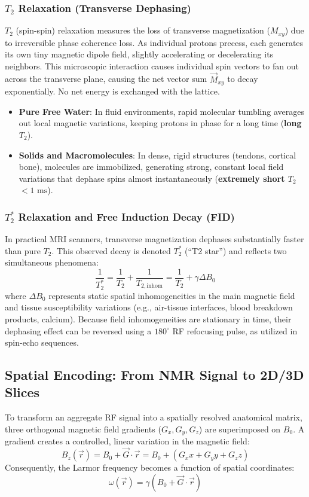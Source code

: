 \documentclass[11pt,a4paper]{article}
\begin{document}
\subsubsection{$T_2$ Relaxation (Transverse Dephasing)}
$T_2$ (spin-spin) relaxation measures the loss of transverse magnetization ($M_{xy}$) due to irreversible phase coherence loss. As individual protons precess, each generates its own tiny magnetic dipole field, slightly accelerating or decelerating its neighbors. This microscopic interaction causes individual spin vectors to fan out across the transverse plane, causing the net vector sum $\vec{M}_{xy}$ to decay exponentially. No net energy is exchanged with the lattice.
\begin{itemize}
    \item \textbf{Pure Free Water}: In fluid environments, rapid molecular tumbling averages out local magnetic variations, keeping protons in phase for a long time (\textbf{long $T_2$}).
    \item \textbf{Solids and Macromolecules}: In dense, rigid structures (tendons, cortical bone), molecules are immobilized, generating strong, constant local field variations that dephase spins almost instantaneously (\textbf{extremely short $T_2$} $< 1\text{ ms}$).
\end{itemize}

\subsubsection{$T_2^*$ Relaxation and Free Induction Decay (FID)}
In practical MRI scanners, transverse magnetization dephases substantially faster than pure $T_2$. This observed decay is denoted $T_2^*$ (``T2 star'') and reflects two simultaneous phenomena:
\begin{equation}
    \frac{1}{T_2^*} = \frac{1}{T_2} + \frac{1}{T_{2,\text{inhom}}} = \frac{1}{T_2} + \gamma \Delta B_0
\end{equation}
where $\Delta B_0$ represents static spatial inhomogeneities in the main magnetic field and tissue susceptibility variations (e.g., air-tissue interfaces, blood breakdown products, calcium). Because field inhomogeneities are stationary in time, their dephasing effect can be reversed using a $180^\circ$ RF refocusing pulse, as utilized in spin-echo sequences.

\subsection{Spatial Encoding: From NMR Signal to 2D/3D Slices}
To transform an aggregate RF signal into a spatially resolved anatomical matrix, three orthogonal magnetic field gradients ($G_x, G_y, G_z$) are superimposed on $B_0$. A gradient creates a controlled, linear variation in the magnetic field:
\begin{equation}
    B_z(\vec{r}) = B_0 + \vec{G} \cdot \vec{r} = B_0 + (G_x x + G_y y + G_z z)
\end{equation}
Consequently, the Larmor frequency becomes a function of spatial coordinates:
\begin{equation}
    \omega(\vec{r}) = \gamma \left(B_0 + \vec{G} \cdot \vec{r}\right)
\end{equation}
\end{document}
